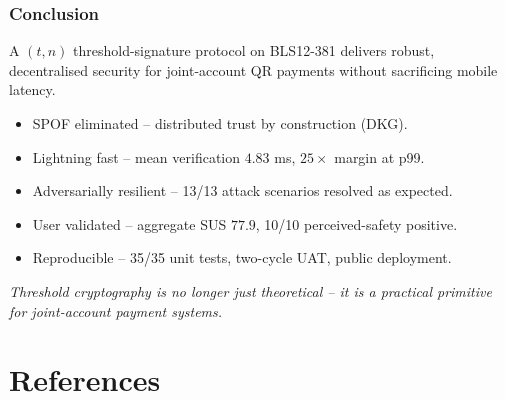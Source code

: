 \documentclass{beamer}
\newcommand{\pos}[1]{\textcolor{positive}{#1}}
\newcommand{\HL}[1]{\textcolor{emphasis}{#1}}
\begin{document}
\begin{frame}
  \frametitle{Conclusion}
  A $(t,n)$ threshold-signature protocol on BLS12-381 delivers \HL{robust, decentralised} security for joint-account QR payments \HL{without sacrificing mobile latency}.
  \vspace{0.2cm}
  \begin{itemize}
      \item \pos{SPOF eliminated} -- distributed trust by construction (DKG).
      \item \pos{Lightning fast} -- mean verification $4.83$ ms, $25\times$ margin at p99.
      \item \pos{Adversarially resilient} -- 13/13 attack scenarios resolved as expected.
      \item \pos{User validated} -- aggregate SUS $77.9$, 10/10 perceived-safety positive.
      \item \pos{Reproducible} -- 35/35 unit tests, two-cycle UAT, public deployment.
  \end{itemize}
  \vspace{0.15cm}
  \textit{Threshold cryptography is no longer just theoretical -- it is a practical primitive for joint-account payment systems.}
\end{frame}

\section*{References}
\end{document}
